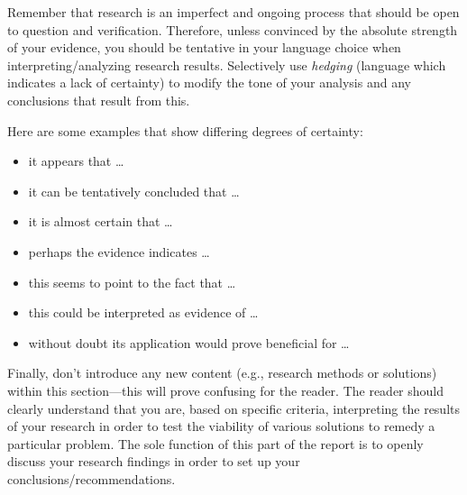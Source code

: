 \documentclass[peerreview]{IEEEtran}
\begin{document}
Remember that research is an imperfect and ongoing process that should be open to question and verification. Therefore, unless convinced by the absolute strength of your evidence, you should be tentative in your language choice when interpreting/analyzing research results. Selectively use {\em hedging} (language which indicates a lack of certainty) to modify the tone of your analysis and any conclusions that result from this. 

Here are some examples that show differing degrees of certainty:
\begin{itemize}  
\item it appears that \ldots
\item it can be tentatively concluded that \ldots
\item it is almost certain that \ldots
\item perhaps the evidence indicates \ldots
\item this seems to point to the fact that \ldots
\item this could be interpreted as evidence of \ldots
\item without doubt its application would prove beneficial for \ldots
\end{itemize}

Finally, don’t introduce any new content (e.g., research methods or solutions) within this section---this will prove confusing for the reader. The reader should clearly understand that you are, based on specific criteria, interpreting the results of your research in order to test the viability of various solutions to remedy a particular problem. The sole function of this part of the report is to openly discuss your research findings in order to set up your conclusions/recommendations.
\end{document}
